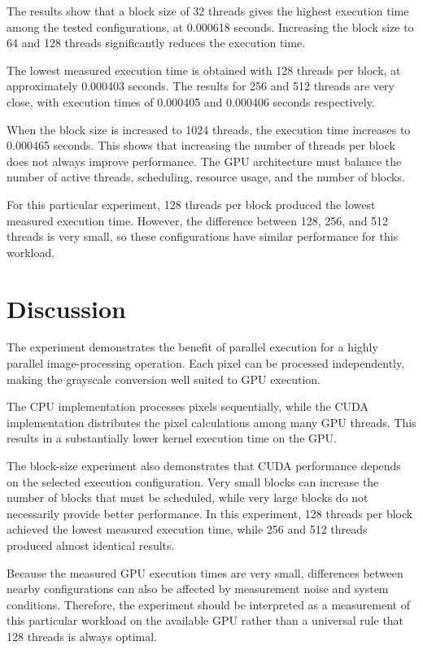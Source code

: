 \documentclass[11pt]{article}
\begin{document}
The results show that a block size of 32 threads gives the highest execution time among the tested configurations, at 0.000618 seconds. Increasing the block size to 64 and 128 threads significantly reduces the execution time.

The lowest measured execution time is obtained with 128 threads per block, at approximately 0.000403 seconds. The results for 256 and 512 threads are very close, with execution times of 0.000405 and 0.000406 seconds respectively.

When the block size is increased to 1024 threads, the execution time increases to 0.000465 seconds. This shows that increasing the number of threads per block does not always improve performance. The GPU architecture must balance the number of active threads, scheduling, resource usage, and the number of blocks.

For this particular experiment, 128 threads per block produced the lowest measured execution time. However, the difference between 128, 256, and 512 threads is very small, so these configurations have similar performance for this workload.

\section{Discussion}

The experiment demonstrates the benefit of parallel execution for a highly parallel image-processing operation. Each pixel can be processed independently, making the grayscale conversion well suited to GPU execution.

The CPU implementation processes pixels sequentially, while the CUDA implementation distributes the pixel calculations among many GPU threads. This results in a substantially lower kernel execution time on the GPU.

The block-size experiment also demonstrates that CUDA performance depends on the selected execution configuration. Very small blocks can increase the number of blocks that must be scheduled, while very large blocks do not necessarily provide better performance. In this experiment, 128 threads per block achieved the lowest measured execution time, while 256 and 512 threads produced almost identical results.

Because the measured GPU execution times are very small, differences between nearby configurations can also be affected by measurement noise and system conditions. Therefore, the experiment should be interpreted as a measurement of this particular workload on the available GPU rather than a universal rule that 128 threads is always optimal.
\end{document}
